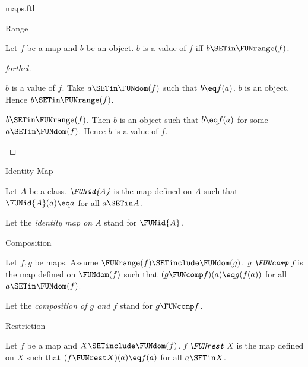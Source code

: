 \documentclass{naproche-library}
\begin{document}
\begin{smodule}[title=Maps]{maps.ftl}
\begin{sfragment}{Range}
  \begin{proposition}[forthel,id=FOUNDATIONS_06_6386349418479616]
    Let $f$ be a map and $b$ be an object.
    $b$ is a value of $f$ iff $b \SETin \FUNrange(f)$.
  \end{proposition}
  \begin{proof}[forthel]
    \begin{case}{$b$ is a value of $f$.}
      Take $a \SETin \FUNdom(f)$ such that $b \eq f(a)$.
      $b$ is an object.
      Hence $b \SETin \FUNrange(f)$.
    \end{case}

    \begin{case}{$b \SETin \FUNrange(f)$.}
      Then $b$ is an object such that $b \eq f(a)$ for some $a \SETin \FUNdom(f)$.
      Hence $b$ is a value of $f$.
    \end{case}
  \end{proof}
\end{sfragment}

\begin{sfragment}{Identity Map}
  \begin{definition}[forthel,id=FOUNDATIONS_06_1920902360989696]
    Let $A$ be a class.
    $\emph{\FUNid{A}}$ is the map defined on $A$ such that $\FUNid{A}(a) \eq a$ for all $a \SETin A$.

    Let the \emph{identity map on $A$} stand for $\FUNid{A}$.
  \end{definition}
\end{sfragment}

\begin{sfragment}{Composition}
  \begin{definition}[forthel,id=FOUNDATIONS_06_7605717729017856]
    Let $f, g$ be maps.
    Assume $\FUNrange(f) \SETinclude \FUNdom(g)$.
    $\emph{g \FUNcomp f}$ is the map defined on $\FUNdom(f)$ such that $(g \FUNcomp f)(a) \eq g(f(a))$ for all $a \SETin \FUNdom(f)$.

    Let the \emph{composition of $g$ and $f$} stand for $g \FUNcomp f$.
  \end{definition}
\end{sfragment}

\begin{sfragment}{Restriction}
  \begin{definition}[forthel,id=FOUNDATIONS_06_7095412741636096]
    Let $f$ be a map and $X \SETinclude \FUNdom(f)$.
    $\emph{f \FUNrest X}$ is the map defined on $X$ such that $(f \FUNrest X)(a) \eq f(a)$ for all $a \SETin X$.


\end{definition}
\end{sfragment}
\end{smodule}
\end{document}
